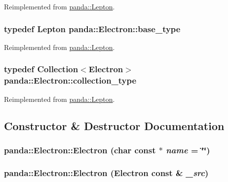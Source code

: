 Reimplemented from \hyperlink{classpanda_1_1Lepton_ad9bce760734162cd7166b034515fe1fe}{panda::Lepton}.\hypertarget{classpanda_1_1Electron_a0fdcdc003b2db72940f10d648b3833a6}{
\subsubsection[{base\_\-type}]{\setlength{\rightskip}{0pt plus 5cm}typedef {\bf Lepton} {\bf panda::Electron::base\_\-type}}}
\label{classpanda_1_1Electron_a0fdcdc003b2db72940f10d648b3833a6}


Reimplemented from \hyperlink{classpanda_1_1Lepton_ab8f2fc84ff093d5200d1905677d15578}{panda::Lepton}.\hypertarget{classpanda_1_1Electron_abf729472e92b96747fc90029ca7ac3a1}{
\subsubsection[{collection\_\-type}]{\setlength{\rightskip}{0pt plus 5cm}typedef {\bf Collection}$<${\bf Electron}$>$ {\bf panda::Electron::collection\_\-type}}}
\label{classpanda_1_1Electron_abf729472e92b96747fc90029ca7ac3a1}


Reimplemented from \hyperlink{classpanda_1_1Lepton_acba098c3047ecbfa9c1ad6c88a3ba95f}{panda::Lepton}.

\subsection{Constructor \& Destructor Documentation}
\hypertarget{classpanda_1_1Electron_acfc2bc09ae177948fc6eef2e4d59946e}{
\subsubsection[{Electron}]{\setlength{\rightskip}{0pt plus 5cm}panda::Electron::Electron (char const $\ast$ {\em name} = {\ttfamily \char`\"{}\char`\"{}})}}
\label{classpanda_1_1Electron_acfc2bc09ae177948fc6eef2e4d59946e}
\hypertarget{classpanda_1_1Electron_af840b7a8130fbf43c745ebfc6f823d01}{
\subsubsection[{Electron}]{\setlength{\rightskip}{0pt plus 5cm}panda::Electron::Electron ({\bf Electron} const \& {\em \_\-src})}}
\label{classpanda_1_1Electron_af840b7a8130fbf43c745ebfc6f823d01}


